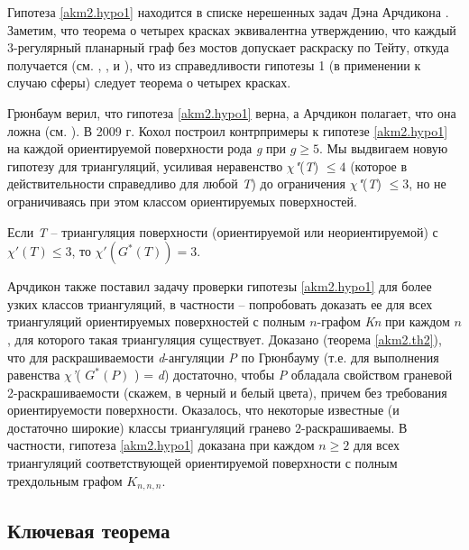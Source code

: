 Гипотеза \ref{akm2.hypo1} находится \cite{archdea1} в списке нерешенных задач Дэна Арчдикона \cite{archdea2}. Заметим, что теорема о четырех красках эквивалентна утверждению, что каждый 3-регулярный планарный граф без мостов допускает раскраску по Тейту, откуда получается (см. \cite{harary}, \cite{bondymurty}, \cite{saatykai} и \cite{archdea1}), что из справедливости гипотезы 1 (в применении к случаю сферы) следует теорема о четырех красках.

Грюнбаум верил, что гипотеза \ref{akm2.hypo1} верна, а Арчдикон полагает, что она ложна (см. \cite{archdea1}). В 2009 г. Кохол \cite{kochol} построил контрпримеры к гипотезе \ref{akm2.hypo1} на каждой ориентируемой поверхности рода \textit{g} при $g \ge 5$. Мы выдвигаем новую гипотезу для триангуляций, усиливая неравенство \textit{$\chi $"}(\textit{T}) $\le 4$ (которое в действительности справедливо для любой \textit{T}) до ограничения \textit{$\chi $"}(\textit{T}) $\le 3$, но не ограничиваясь при этом классом ориентируемых поверхностей.

\begin{hypothesis}
\label{akm2.hypo2}
Если \textit{T} -- триангуляция поверхности (ориентируемой или неориентируемой) с $\chi ' (T) \le 3$, то $\chi '( G^*(T) ) = 3$.
\end{hypothesis}



Арчдикон также поставил \cite{archdea1} задачу проверки гипотезы \ref{akm2.hypo1} для более узких классов триангуляций, в частности -- попробовать доказать ее для всех триангуляций ориентируемых поверхностей с полным $n$-графом \textit{Kn} при каждом $n$, для которого такая триангуляция существует. Доказано (теорема \ref{akm2.th2}), что для раскрашиваемости \textit{d}-ангуляции \textit{P} по Грюнбауму (т.е. для выполнения равенства \textit{$\chi $'}( $G^*(P)$ ) = \textit{d}) достаточно, чтобы \textit{P} обладала свойством граневой 2-раскрашиваемости (скажем, в черный и белый цвета), причем без требования ориентируемости поверхности. Оказалось, что некоторые известные (и достаточно широкие) классы триангуляций гранево $2$-раскрашиваемы. В частности, гипотеза \ref{akm2.hypo1} доказана при каждом $n\ge2$ для всех триангуляций соответствующей ориентируемой поверхности с полным трехдольным графом $K_{n,n,n}$.

\subsection{Ключевая теорема}

